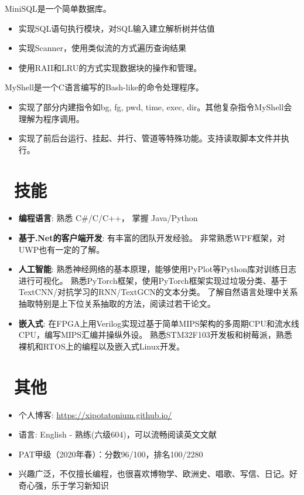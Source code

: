 \documentclass{resume}
\begin{document}
MiniSQL是一个简单数据库。
\begin{itemize}
  \item 实现SQL语句执行模块，对SQL输入建立解析树并估值
  \item 实现Scanner，使用类似流的方式遍历查询结果
  \item 使用RAII和LRU的方式实现数据块的操作和管理。
\end{itemize}

MyShell是一个C语言编写的Bash-like的命令处理程序。
\begin{itemize}
    \item 实现了部分内建指令如bg, fg, pwd, time, exec, dir。其他复杂指令MyShell会理解为程序调用。
    \item 实现了前后台运行、挂起、并行、管道等特殊功能。支持读取脚本文件并执行。
\end{itemize}

\section{\faCogs\ 技能}
\begin{itemize}[parsep=0.25ex]
    \item \textbf{编程语言}:
        熟悉 C\#/C/C++，
        掌握 Java/Python

    \item \textbf{基于.Net的客户端开发}:
        有丰富的团队开发经验。
        非常熟悉WPF框架，对UWP也有一定的了解。

    \item \textbf{人工智能}:
        熟悉神经网络的基本原理，能够使用PyPlot等Python库对训练日志进行可视化。
        熟悉PyTorch框架，使用PyTorch框架实现过垃圾分类、基于TextCNN/对抗学习的RNN/TextGCN的文本分类。
        了解自然语言处理中关系抽取特别是上下位关系抽取的方法，阅读过若干论文。

    \item \textbf{嵌入式}:
        在FPGA上用Verilog实现过基于简单MIPS架构的多周期CPU和流水线CPU，编写MIPS汇编并操纵外设。
        熟悉STM32F103开发板和树莓派，熟悉裸机和RTOS上的编程以及嵌入式Linux开发。
\end{itemize}


\section{\faInfo\ 其他}
\begin{itemize}[parsep=0.25ex]
  \item 个人博客: \url{https://xipotatonium.github.io/}
  \item 语言: English - 熟练(六级604)，可以流畅阅读英文文献
  \item PAT甲级（2020年春）：分数96/100，排名100/2280
  \item 兴趣广泛，不仅擅长编程，也很喜欢博物学、欧洲史、唱歌、写信、日记。好奇心强，乐于学习新知识
\end{itemize}
\end{document}
